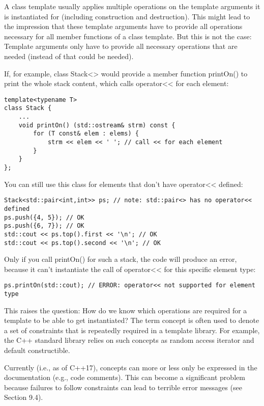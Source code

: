 
A class template usually applies multiple operations on the template arguments it is instantiated for (including construction and destruction). This might lead to the impression that these template arguments have to provide all operations necessary for all member functions of a class template. But this is not the case: Template arguments only have to provide all necessary operations that are needed (instead of that could be needed).

If, for example, class Stack<> would provide a member function printOn() to print the whole stack content, which calls operator<< for each element:

\begin{lstlisting}[style=styleCXX]
template<typename T>
class Stack {
	...
	void printOn() (std::ostream& strm) const {
		for (T const& elem : elems) {
			strm << elem << ' '; // call << for each element
		}
	}
};
\end{lstlisting}

You can still use this class for elements that don’t have operator<< defined:

\begin{lstlisting}[style=styleCXX]
Stack<std::pair<int,int>> ps; // note: std::pair<> has no operator<< defined
ps.push({4, 5}); // OK
ps.push({6, 7}); // OK
std::cout << ps.top().first << '\n'; // OK
std::cout << ps.top().second << '\n'; // OK
\end{lstlisting}

Only if you call printOn() for such a stack, the code will produce an error, because it can’t instantiate the call of operator<< for this specific element type:

\begin{lstlisting}[style=styleCXX]
ps.printOn(std::cout); // ERROR: operator<< not supported for element type
\end{lstlisting}


This raises the question: How do we know which operations are required for a template to be able to get instantiated? The term concept is often used to denote a set of constraints that is repeatedly required in a template library. For example, the C++ standard library relies on such concepts as random access iterator and default constructible.

Currently (i.e., as of C++17), concepts can more or less only be expressed in the documentation (e.g., code comments). This can become a significant problem because failures to follow constraints can lead to terrible error messages (see Section 9.4).


